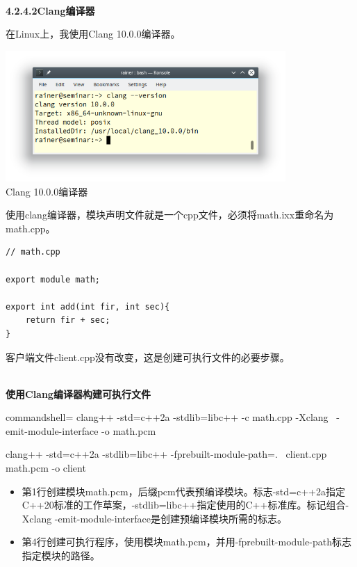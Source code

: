 \hspace*{\fill} \\ %
\noindent
\textbf{4.2.4.2\hspace{0.2cm}Clang编译器}

在Linux上，我使用Clang 10.0.0编译器。

\begin{center}
\includegraphics[width=0.8\textwidth]{content/3/chapter4/images/19.png}\\
Clang 10.0.0编译器
\end{center}

使用clang编译器，模块声明文件就是一个cpp文件，必须将math.ixx重命名为math.cpp。

\begin{lstlisting}[style=styleCXX]
// math.cpp

export module math;

export int add(int fir, int sec){
	return fir + sec;
}
\end{lstlisting}

客户端文件client.cpp没有改变，这是创建可执行文件的必要步骤。

\hspace*{\fill} \\ %
\noindent
\textbf{使用Clang编译器构建可执行文件}
\begin{tcblisting}{commandshell={}}
clang++ -std=c++2a -stdlib=libc++ -c math.cpp -Xclang \ 
  -emit-module-interface -o math.pcm

clang++ -std=c++2a -stdlib=libc++ -fprebuilt-module-path=. \ 
  client.cpp math.pcm -o client
\end{tcblisting}

\begin{itemize}
\item 
第1行创建模块math.pcm，后缀pcm代表预编译模块。标志-std=c++2a指定C++20标准的工作草案，-stdlib=libc++指定使用的C++标准库。标记组合-Xclang -emit-module-interface是创建预编译模块所需的标志。

\item 
第4行创建可执行程序，使用模块math.pcm，并用-fprebuilt-module-path标志指定模块的路径。
\end{itemize}

